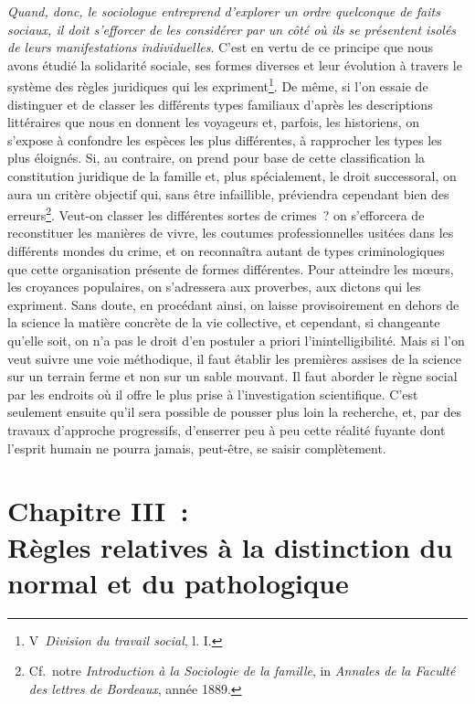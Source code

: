\documentclass[french,twoside]{book} %
\newcommand\chapteropen{} %
\newcommand\chapterclose{} %
\begin{document}
{\itshape Quand, donc, le sociologue entreprend d’explorer un ordre quelconque de faits sociaux, il doit s’efforcer de les considérer par un côté où ils se présentent isolés de leurs manifestations individuelles}. C’est en vertu de ce principe que nous avons étudié la solidarité sociale, ses formes diverses et leur évolution à travers le système des règles juridiques qui les expriment\footnote{ V \emph{Division du travail social}, l. I.}. De même, si l’on essaie de distinguer et de classer les différents types familiaux d’après les descriptions littéraires que nous en donnent les voyageurs et, parfois, les historiens, on s’expose à confondre les espèces les plus différentes, à rapprocher les types les plus éloignés. Si, au contraire, on prend pour base de cette classification la constitution juridique de la famille et, plus spécialement, le droit successoral, on aura un critère objectif qui, sans être infaillible, préviendra cependant bien des erreurs\footnote{ Cf. notre \emph{Introduction à la Sociologie de la famille}, in \emph{Annales de la Faculté des lettres de Bordeaux}, année 1889.}. Veut-on classer les différentes sortes de crimes ? on s’efforcera de reconstituer les manières de vivre, les coutumes professionnelles usitées dans les différents mondes du crime, et on reconnaîtra autant de types criminologiques que cette organisation présente de formes différentes. Pour atteindre les mœurs, les croyances populaires, on s’adressera aux proverbes, aux dictons qui les expriment. Sans doute, en procédant ainsi, on laisse provisoirement en dehors de la science la matière concrète de la vie collective, et cependant, si changeante qu’elle soit, on n’a pas le droit d’en postuler a priori l’inintelligibilité. Mais si l’on veut suivre une voie méthodique, il faut établir les premières assises de la science sur un terrain ferme et non sur un sable mouvant. Il faut aborder le règne social par les endroits où il offre le plus prise à l’investigation scientifique. C’est seulement ensuite qu’il sera possible de pousser plus loin la recherche, et, par des travaux d’approche progressifs, d’enserrer peu à peu cette réalité fuyante dont l’esprit humain ne pourra jamais, peut-être, se saisir complètement.
\chapterclose


\chapteropen
\chapter[{Chapitre III : Règles relatives à la distinction du normal et du pathologique}]{Chapitre III : \\
Règles relatives à la distinction du normal et du pathologique}\renewcommand{\leftmark}{Chapitre III : \\
Règles relatives à la distinction du normal et du pathologique}
\end{document}
